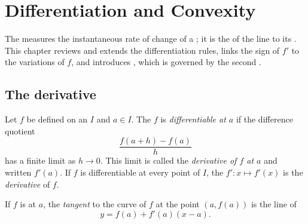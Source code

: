 \chapter{Differentiation and Convexity}\label{ch:g12:deriv}

The  measures the instantaneous rate of change of a ; it is
the  of the  line to its . This chapter reviews and extends
the differentiation rules, links the sign of $f'$ to the variations of $f$,
and introduces , which is governed by the second .

\section{The derivative}

\begin{definition}\label{def:g12:deriv:derivative}
Let $f$ be defined on an  $I$ and $a \in I$. The  $f$ is
\emph{differentiable at $a$} if the difference quotient
\[
\frac{f(a+h) - f(a)}{h}
\]
has a finite limit as $h \to 0$. This limit is called the \emph{derivative of
$f$ at $a$} and written $f'(a)$. If $f$ is differentiable at every point of
$I$, the  $f' \colon x \mapsto f'(x)$ is the \emph{derivative} of
$f$.
\end{definition}

\begin{definition}\label{def:g12:deriv:tangent}
If $f$ is  at $a$, the \emph{tangent} to the
curve of $f$ at the point $(a, f(a))$ is the line of 
\[
y = f(a) + f'(a)(x - a).
\]
\end{definition}

